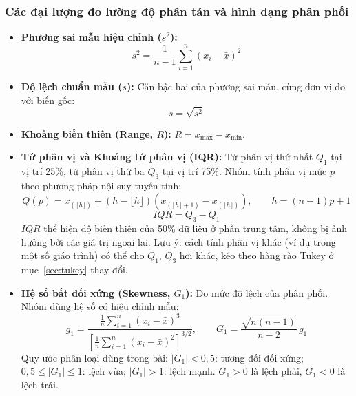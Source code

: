\documentclass[12pt,a4paper]{article}
\newcommand{\xbar}{\bar{x}}
\begin{document}
\subsubsection{Các đại lượng đo lường độ phân tán và hình dạng phân phối}

\begin{itemize}
  \item \textbf{Phương sai mẫu hiệu chỉnh ($s^2$):}
  \begin{equation}
    s^2 = \frac{1}{n-1}\sum_{i=1}^{n}(x_i - \xbar)^2
  \end{equation}
  \item \textbf{Độ lệch chuẩn mẫu ($s$):} Căn bậc hai của phương sai mẫu, cùng đơn vị đo với
  biến gốc:
  \begin{equation}
    s = \sqrt{s^2}
  \end{equation}
  \item \textbf{Khoảng biến thiên (Range, $R$):} $R = x_{\max} - x_{\min}$.
  \item \textbf{Tứ phân vị và Khoảng tứ phân vị (IQR):} Tứ phân vị thứ nhất $Q_1$ tại vị trí
  25\%, tứ phân vị thứ ba $Q_3$ tại vị trí 75\%. Nhóm tính phân vị mức $p$ theo phương pháp
  nội suy tuyến tính:
  \begin{equation}
    Q(p) = x_{(\lfloor h \rfloor)} + (h - \lfloor h \rfloor)\left(x_{(\lfloor h \rfloor + 1)} - x_{(\lfloor h \rfloor)}\right),
    \qquad h = (n-1)p + 1
  \end{equation}
  \begin{equation}
    IQR = Q_3 - Q_1
  \end{equation}
  $IQR$ thể hiện độ biến thiên của 50\% dữ liệu ở phần trung tâm, không bị ảnh hưởng bởi các
  giá trị ngoại lai. Lưu ý: cách tính phân vị khác (ví dụ trong một số giáo trình) có thể cho
  $Q_1$, $Q_3$ hơi khác, kéo theo hàng rào Tukey ở mục~\ref{sec:tukey} thay đổi.

  \item \textbf{Hệ số bất đối xứng (Skewness, $G_1$):} Đo mức độ lệch của phân phối. Nhóm dùng
  hệ số có hiệu chỉnh mẫu:
  \begin{equation}
    g_1 = \frac{\frac{1}{n}\sum_{i=1}^{n}(x_i-\xbar)^3}{\left[\frac{1}{n}\sum_{i=1}^{n}(x_i-\xbar)^2\right]^{3/2}},
    \qquad
    G_1 = \frac{\sqrt{n(n-1)}}{n-2}\, g_1
  \end{equation}
  Quy ước phân loại dùng trong bài: $|G_1| < 0{,}5$: tương đối đối xứng;
  $0{,}5 \le |G_1| \le 1$: lệch vừa; $|G_1| > 1$: lệch mạnh. $G_1 > 0$ là lệch phải, $G_1 < 0$
  là lệch trái.
\end{itemize}
\end{document}
